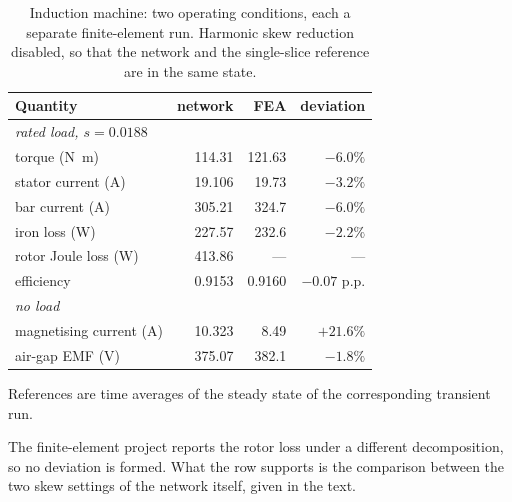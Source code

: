 \documentclass[10pt,a4paper,twocolumn]{article}
\theoremstyle{plain}
\theoremstyle{remark}
\begin{document}
\begin{table}[!ht]
\centering
\begin{threeparttable}
\footnotesize
\begin{tabular}{@{}lrrr@{}}
\toprule
Quantity & network & FEA & deviation\\
\midrule
\multicolumn{4}{l}{\emph{rated load, $s=\num{0.0188}$}}\\
torque (\si{\newton\metre})          & 114.31  & 121.63 & $-6.0\%$\\
stator current (\si{\ampere})        & 19.106  & 19.73  & $-3.2\%$\\
bar current (\si{\ampere})           & 305.21  & 324.7  & $-6.0\%$\\
iron loss (\si{\watt})               & 227.57  & 232.6  & $-2.2\%$\\
rotor Joule loss (\si{\watt})\tnote{a}& 413.86 & ---    & ---\\
efficiency                           & 0.9153  & 0.9160 & $-0.07$ p.p.\\
\midrule
\multicolumn{4}{l}{\emph{no load}}\\
magnetising current (\si{\ampere})   & 10.323  & 8.49   & $+21.6\%$\\
air-gap EMF (\si{\volt})             & 375.07  & 382.1  & $-1.8\%$\\
\bottomrule
\end{tabular}
\begin{tablenotes}[flushleft]\footnotesize
\item References are time averages of the steady state of the
corresponding transient run.
\item[a] The finite-element project reports the rotor loss under a
different decomposition, so no deviation is formed. What the row
supports is the comparison between the two skew settings of the network
itself, given in the text.
\end{tablenotes}
\end{threeparttable}
\caption{Induction machine: two operating conditions, each a separate
finite-element run. Harmonic skew reduction disabled, so that the
network and the single-slice reference are in the same state.}
\label{tab:im_tests}
\end{table}
\end{document}
